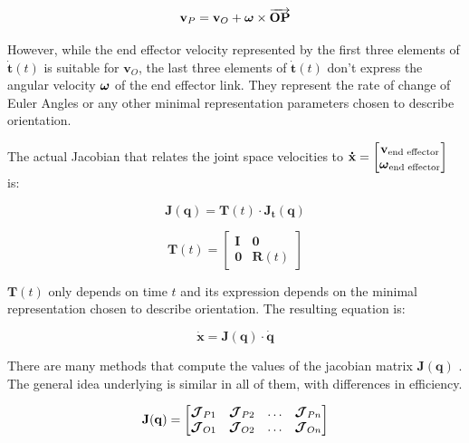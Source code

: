\begin{equation}
\label{eq:velfield}
\mathbf{v}_{P} = \mathbf{v}_{O} + \mbox{\boldmath$\omega$} \times \overrightarrow{\mathbf{OP}}
\end{equation}

However, while the end effector velocity represented by the first three elements of $\mathbf{\dot{t}}(t)$ is suitable for $\mathbf{v}_{O}$, the last three elements of $\mathbf{\dot{t}}(t)$ don't express the angular velocity $\mbox{\boldmath$\omega$}$ of the end effector link. They represent the rate of change of Euler Angles or any other minimal representation parameters chosen to describe orientation.

The actual Jacobian that relates the joint space velocities to $\mathbf{\dot{x}} = \begin{bmatrix} \mathbf{v}_{\text{end effector}} \\ \mbox{\boldmath$\omega$}_{\text{end effector}} \end{bmatrix}$ is:

$$
\mathbf{J}(\mathbf{{q}}) = \mathbf{T}(t) \cdot \mathbf{J}_{\mathbf{t}}(\mathbf{{q}})
$$

$$
\mathbf{T}(t) = \begin{bmatrix}\mathbf{I} & \mathbf{0} \\ \mathbf{0} & \mathbf{R}(t)\end{bmatrix}
$$

$\mathbf{T}(t)$ only depends on time $t$ and its expression depends on the minimal representation chosen to describe orientation. The resulting equation is:

\begin{equation}
    \label{eq:FIK}
    \mathbf{\dot{x}} = \mathbf{J}(\mathbf{{q}}) \cdot \mathbf{\dot{q}}
\end{equation}

There are many methods that compute the values of the jacobian matrix $\mathbf{J}(\mathbf{{q}})$ \cite{Orin1984}. The general idea underlying is similar in all of them, with differences in efficiency.

$$
\mathbf{J}(\mathbf{{q}}) = \begin{bmatrix} \mbox{\boldmath$\mathcal{J}$}_{P1} & \mbox{\boldmath$\mathcal{J}$}_{P2} & \dots & \mbox{\boldmath$\mathcal{J}$}_{Pn} \\  \mbox{\boldmath$\mathcal{J}$}_{O1} & \mbox{\boldmath$\mathcal{J}$}_{O2} & \dots & \mbox{\boldmath$\mathcal{J}$}_{On} \end{bmatrix}
$$

